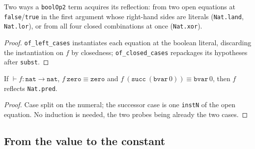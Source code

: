 \begin{lemma}
\label{vpc:thm:reflects-bool-cases}
\leanok
{}

 Two ways a \texttt{boolOp2} term acquires its reflection: from two open equations
at \texttt{false}/\texttt{true} in the first argument whose right-hand sides are literals
(\texttt{Nat.land}, \texttt{Nat.lor}), or from all four closed combinations at once
(\texttt{Nat.xor}).
\end{lemma}
\begin{proof}\leanok
{}
 \texttt{of\_left\_cases} instantiates each equation at the boolean literal,
discarding the instantiation on $f$ by closedness; \texttt{of\_closed\_cases} repackages its
hypotheses after \texttt{subst}.
\end{proof}

\begin{lemma}
\label{vpc:thm:reflects-pred-eqns}
\leanok
{}

 If $\vdash f : \mathtt{nat} \to \mathtt{nat}$, $f\ \mathtt{zero} \equiv
\mathtt{zero}$ and $f\ (\mathtt{succ}\ (\mathtt{bvar}\,0)) \equiv \mathtt{bvar}\,0$, then $f$
reflects \texttt{Nat.pred}.
\end{lemma}
\begin{proof}\leanok
{}
 Case split on the numeral; the successor case is one \texttt{instN} of the open
equation. No induction is needed, the two probes being already the two cases.
\end{proof}

\subsection{From the value to the constant}

